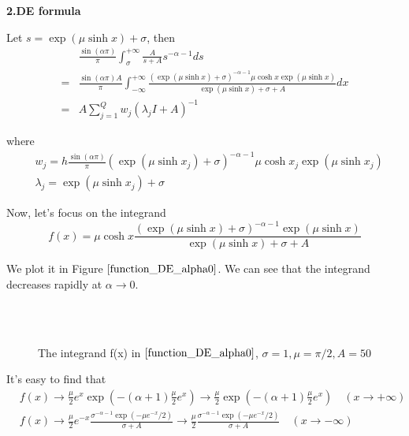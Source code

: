 \textbf{ 2.DE formula}

Let $s=\exp(\mu\sinh x)+\sigma$, then
\begin{equation}
\begin{aligned}
&\frac{\sin(\alpha \pi)}{\pi}\int_{\sigma}^{+\infty}\frac{A}{s+A}s^{-\alpha-1}ds\\
=&\frac{\sin(\alpha \pi)A}{\pi}\int_{-\infty}^{+\infty}\frac{(\exp(\mu\sinh x)+\sigma)^{-\alpha-1}\mu\cosh x\exp(\mu\sinh x)}{\exp(\mu\sinh x)+\sigma+A}dx\\
=& A\sum_{j=1}^{Q} w_j(\lambda_j I+ A)^{-1}
\end{aligned}
\end{equation}

where
\begin{equation}
\begin{aligned}
& w_j=h\frac{\sin(\alpha\pi)}{\pi}(\exp(\mu\sinh x_j)+\sigma)^{-\alpha-1}\mu\cosh x_j\exp(\mu\sinh x_j)\\
& \lambda_j=\exp(\mu\sinh x_j)+\sigma
\end{aligned}
\end{equation}

Now, let's focus on the integrand
\begin{equation}
f(x)=\mu\cosh x\frac{(\exp(\mu\sinh x)+\sigma)^{-\alpha-1}\exp(\mu\sinh x)}{\exp(\mu\sinh x)+\sigma+A}
\label{function_DE_alpha0}
\end{equation}



We plot it in Figure $\ref{function_DE_alpha0}$.  We can see that the integrand decreases rapidly at $\alpha \rightarrow 0$.

\begin{figure}[htbp]
\centering
{}
~~
~~
\\
~~
~~
  \caption{The integrand f(x) in $\eqref{function_DE_alpha0}$, $\sigma=1,\mu=\pi/2,A=50$}
  \label{function_DE_alpha0}
\end{figure}



It's easy to find that
\begin{equation}
\begin{aligned}
& f(x) \rightarrow \frac{\mu}{2}e^x \exp(-(\alpha+1)\frac{\mu}{2}e^x)\rightarrow  \frac{\mu}{2} \exp(-(\alpha+1)\frac{\mu}{2}e^x) \quad(x\rightarrow +\infty)\\
& f(x) \rightarrow \frac{\mu}{2}e^{-x} \frac{\sigma^{-\alpha-1}\exp(-\mu e^{-x}/2)}{\sigma+A}\rightarrow \frac{\mu}{2} \frac{\sigma^{-\alpha-1}\exp(-\mu e^{-x}/2)}{\sigma+A} \quad(x\rightarrow -\infty)
\end{aligned}
\end{equation}

